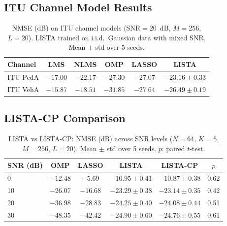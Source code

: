 \documentclass[a4paper,fleqn]{cas-sc}
\begin{document}

\subsection{ITU Channel Model Results}\label{sec:supp_itu}

\begin{table}[width=.9\linewidth,cols=6,pos=!htbp]
\caption{NMSE (dB) on ITU channel models (SNR$=20$~dB, $M=256$, $L=20$). LISTA trained on i.i.d.~Gaussian data with mixed SNR. Mean $\pm$ std over 5 seeds.}\label{tab:itu}
\begin{tabular*}{\tblwidth}{@{} LCCCCC@{}}
\toprule
Channel & LMS & NLMS & OMP & LASSO & LISTA \\
\midrule
ITU PedA & $-17.00$ & $-22.17$ & $\bm{-27.30}$ & $-27.07$ & $-23.16 \pm 0.33$ \\
ITU VehA & $-15.87$ & $-18.51$ & $\bm{-31.85}$ & $-27.64$ & $-26.49 \pm 0.19$ \\
\bottomrule
\end{tabular*}
\end{table}



\subsection{LISTA-CP Comparison}\label{sec:supp_lista_cp}

\begin{table}[width=.9\linewidth,cols=5,pos=!htbp]
\caption{LISTA vs LISTA-CP: NMSE (dB) across SNR levels ($N=64$, $K=5$, $M=256$, $L=20$). Mean $\pm$ std over 5 seeds. $p$: paired $t$-test.}\label{tab:lista_cp}
\begin{tabular*}{\tblwidth}{@{} LCCCCC@{}}
\toprule
SNR (dB) & OMP & LASSO & LISTA & LISTA-CP & $p$ \\
  & $-12.48$ & $-5.69$ & $-10.95 \pm 0.41$ & $-10.87 \pm 0.38$ & 0.62 \\
10 & $-26.07$ & $-16.68$ & $-23.29 \pm 0.38$ & $-23.14 \pm 0.35$ & 0.42 \\
20 & $-36.98$ & $-28.83$ & $-24.25 \pm 0.40$ & $-24.08 \pm 0.44$ & 0.51 \\
30 & $-48.35$ & $-42.42$ & $-24.90 \pm 0.60$ & $-24.76 \pm 0.55$ & 0.61 \\
\bottomrule
\end{tabular*}
\end{table}
\end{document}
